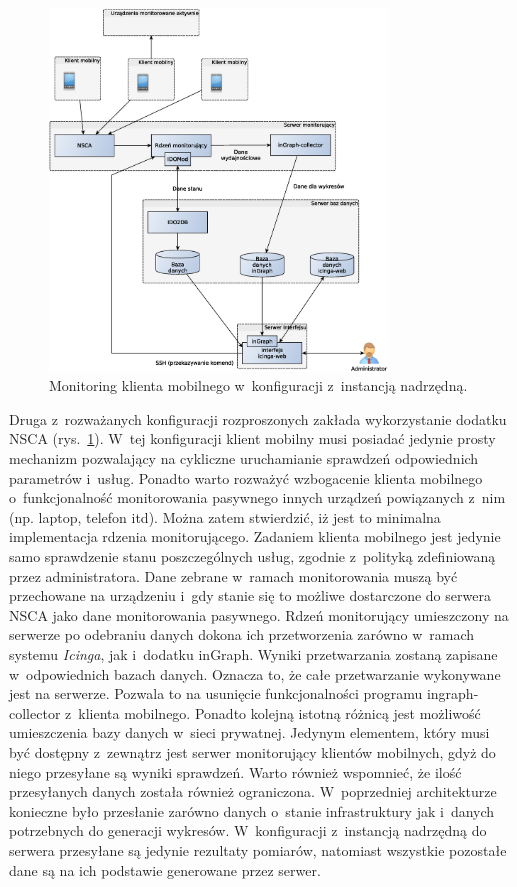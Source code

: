 \begin{figure}[ht]
  \centering
  \caption{Monitoring klienta mobilnego w~konfiguracji z~instancją
    nadrzędną.}
  \label{fig:mobilnyInstancja}
\includegraphics[width=0.80\textwidth]{img/mobilnyInstancja}
\end{figure}

Druga z~rozważanych konfiguracji rozproszonych zakłada wykorzystanie
dodatku NSCA (rys.~\ref{fig:mobilnyInstancja}). W~tej konfiguracji
klient mobilny musi posiadać jedynie prosty mechanizm pozwalający na
cykliczne uruchamianie sprawdzeń odpowiednich parametrów
i~usług. Ponadto warto rozważyć wzbogacenie klienta mobilnego
o~funkcjonalność monitorowania pasywnego innych urządzeń powiązanych
z~nim (np. laptop, telefon itd). Można zatem stwierdzić, iż jest to
minimalna implementacja rdzenia monitorującego. Zadaniem klienta
mobilnego jest jedynie samo sprawdzenie stanu poszczególnych usług,
zgodnie z~polityką zdefiniowaną przez administratora. Dane zebrane
w~ramach monitorowania muszą być przechowane na urządzeniu i~gdy
stanie się to możliwe dostarczone do serwera NSCA jako dane
monitorowania pasywnego. Rdzeń monitorujący umieszczony na serwerze po
odebraniu danych dokona ich przetworzenia zarówno w~ramach systemu
{\em Icinga}, jak i~dodatku inGraph. Wyniki przetwarzania zostaną
zapisane w~odpowiednich bazach danych. Oznacza to, że całe przetwarzanie
wykonywane jest na serwerze. Pozwala to na usunięcie funkcjonalności
programu ingraph-collector z~klienta mobilnego. Ponadto kolejną
istotną różnicą jest możliwość umieszczenia bazy danych w~sieci
prywatnej. Jedynym elementem, który musi być dostępny z~zewnątrz jest
serwer monitorujący klientów mobilnych, gdyż do niego przesyłane są
wyniki sprawdzeń. Warto również wspomnieć, że ilość przesyłanych
danych została również ograniczona. W~poprzedniej architekturze
konieczne było przesłanie zarówno danych o~stanie infrastruktury jak
i~danych potrzebnych do generacji wykresów. W~konfiguracji z~instancją
nadrzędną do serwera przesyłane są jedynie rezultaty pomiarów,
natomiast wszystkie pozostałe dane są na ich podstawie generowane
przez serwer.

